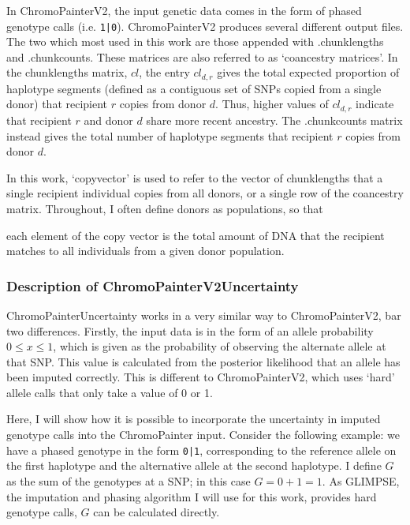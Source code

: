 In ChromoPainterV2, the input genetic data comes in the form of phased genotype calls (i.e. \texttt{1|0}). ChromoPainterV2 produces several different output files. The two which most used in this work are those appended with .chunklengths and .chunkcounts. These matrices are also referred to as `coancestry matrices'. In the chunklengths matrix, $cl$, the entry $cl_{d,r}$ gives the total expected proportion of haplotype segments (defined as a contiguous set of SNPs copied from a single donor) that recipient $r$ copies from donor $d$. Thus, higher values of $cl_{d,r}$ indicate that recipient $r$ and donor $d$ share more recent ancestry. The .chunkcounts matrix instead gives the total number of haplotype segments that recipient $r$ copies from donor $d$.

In this work, `copyvector' is used to refer to the vector of chunklengths that a single recipient individual copies from all donors, or a single row of the coancestry matrix. Throughout, I often define donors as populations, so that{ each element of the copy vector is the total amount of DNA that the recipient matches to all individuals from a given donor population.

\subsubsection{Description of ChromoPainterV2Uncertainty} \label{sec:DescriptionChromoPainterV2Uncertainty}

ChromoPainterUncertainty works in a very similar way to ChromoPainterV2, bar two differences. Firstly, the input data is in the form of an allele probability $0 \leq x \leq 1$, which is given as the probability of observing the alternate allele at that SNP. This value is calculated from the posterior likelihood that an allele has been imputed correctly. This is different to ChromoPainterV2, which uses `hard' allele calls that only take a value of 0 or 1.

Here, I will show how it is possible to incorporate the uncertainty in imputed genotype calls into the ChromoPainter input. Consider the following example: we have a phased genotype in the form \texttt{0|1}, corresponding to the reference allele on the first haplotype and the alternative allele at the second haplotype. I define $G$ as the sum of the genotypes at a SNP; in this case $G=0+1=1$. As GLIMPSE, the imputation and phasing algorithm I will use for this work, provides hard genotype calls, $G$ can be calculated directly.

}

